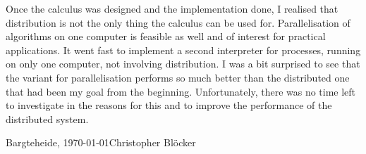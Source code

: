 Once the calculus was designed and the implementation done, I realised that distribution is not the only thing the calculus can be used for. Parallelisation of algorithms on one computer is feasible as well and of interest for practical applications. It went fast to implement a second interpreter for processes, running on only one computer, not involving distribution. I was a bit surprised to see that the variant for parallelisation performs so much better than the distributed one that had been my goal from the beginning. Unfortunately, there was no time left to investigate in the reasons for this and to improve the performance of the distributed system.

\vfill

\noindent
Bargteheide, \today \hfill Christopher Blöcker